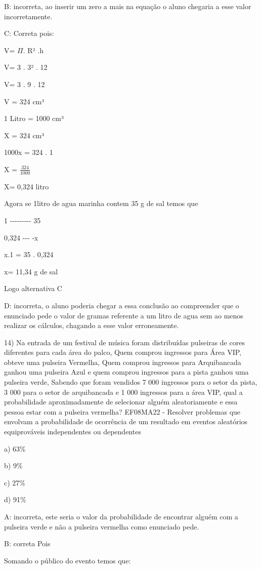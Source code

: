 B: incorreta, ao inserir um zero a mais na equação o aluno chegaria a
esse valor incorretamente.

C: Correta pois:

V= \(\Pi\). R² .h

V= 3 . 3² . 12

V= 3 . 9 . 12

V = 324 cm³

1 Litro = 1000 cm³

X = 324 cm³

1000x = 324 . 1

X = \(\frac{324}{1000}\)

X= 0,324 litro

Agora se 1litro de agua marinha contem 35 g de sal temos que

1 -\/-\/-\/-\/-\/-\/-\/-\/- 35

0,324 -\/-\/- -x

x.1 = 35 . 0,324

x= 11,34 g de sal

Logo alternativa C

D: incorreta, o aluno poderia chegar a essa conclusão ao compreender que
o enunciado pede o valor de gramas referente a um litro de agua sem ao
menos realizar os cálculos, chagando a esse valor erroneamente.

14) Na entrada de um festival de música foram distribuídas pulseiras de
cores diferentes para cada área do palco, Quem comprou ingressos para
Área VIP, obteve uma pulseira Vermelha, Quem comprou ingressos para
Arquibancada ganhou uma pulseira Azul e quem comprou ingressos para a
pista ganhou uma pulseira verde, Sabendo que foram vendidos 7 000
ingressos para o setor da pista, 3 000 para o setor de arquibancada e 1
000 ingressos para a área VIP, qual a probabilidade aproximadamente de
selecionar alguém aleatoriamente e essa pessoa estar com a pulseira
vermelha? EF08MA22 - Resolver problemas que envolvam a probabilidade de
ocorrência de um resultado em eventos aleatórios equiprováveis
independentes ou dependentes

a) 63\%

b) 9\%

c) 27\%

d) 91\%

A: incorreta, este seria o valor da probabilidade de encontrar alguém
com a pulseira verde e não a pulseira vermelha como enunciado pede.

B: correta Pois

Somando o público do evento temos que:

